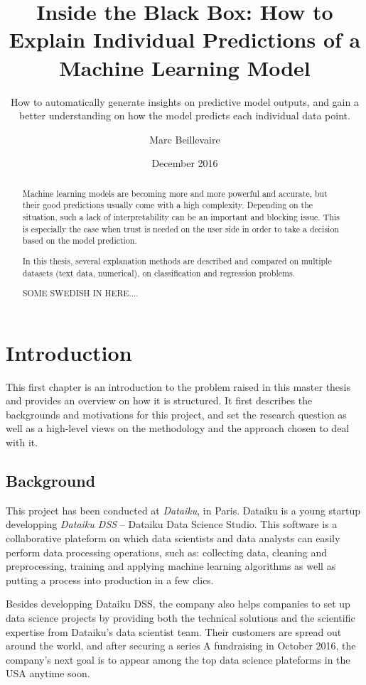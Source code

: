 \documentclass[a4paper,11pt]{kth-mag}
\title{Inside the Black Box: How to Explain Individual Predictions of a Machine Learning Model}
\subtitle{How to automatically generate insights on predictive model outputs, and gain 
	a better understanding on how the model predicts each individual data point.}
\author{Marc Beillevaire}
\date{December 2016}
\begin{document}
\frontmatter
\maketitle


\begin{abstract}
Machine learning models are becoming more and more powerful and accurate, but their good predictions usually come with a high complexity. Depending on the situation, such a lack of interpretability can be an important and blocking issue. This is especially the case when trust is needed on the user side in order to take a decision based on the model prediction.

In this thesis, several explanation methods are described and compared on multiple datasets (text data, numerical), on classification and regression problems.
\end{abstract}

\clearpage
{}
\begin{abstract}
  SOME SWEDISH IN HERE....
\end{abstract}
\clearpage
\tableofcontents
\mainmatter



\chapter{Introduction}

This first chapter is an introduction to the problem raised in this master thesis and provides an overview on how it is structured. It first describes the backgrounds and motivations for this project, and set the research question as well as a high-level views on the methodology and the approach chosen to deal with it.

\section{Background}

This project has been conducted at \textit{Dataiku}, in Paris. Dataiku is a young startup developping \textit{Dataiku DSS} -- Dataiku Data Science Studio. This software is a collaborative plateform on which data scientists and data analysts can easily perform data processing operations, such as: collecting data, cleaning and preprocessing, training and applying machine learning algorithms as well as putting a process into production in a few clics.

Besides developping Dataiku DSS, the company also helps companies to set up data science projects by providing both the technical solutions and the scientific expertise from Dataiku's data scientist team. Their customers are spread out around the world, and after securing a series A fundraising in October 2016, the company's next goal is to appear among the top data science plateforms in the USA anytime soon.
\end{document}
